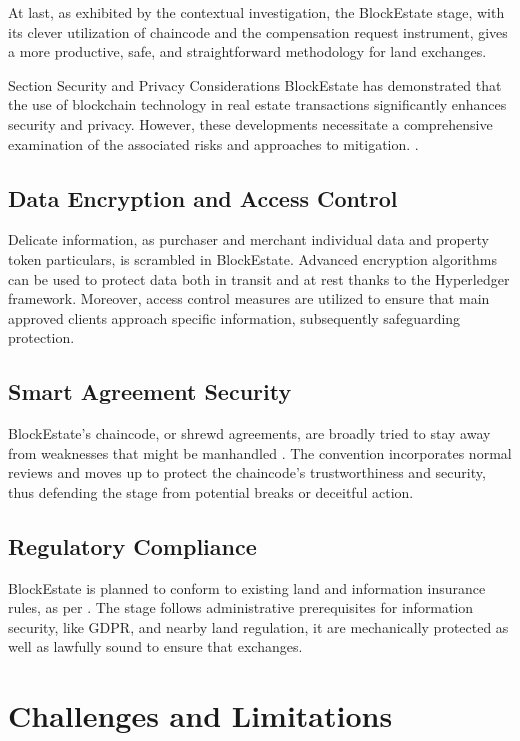 \documentclass[3p,times]{elsarticle}
\begin{document}
At last, as exhibited by the contextual investigation, the BlockEstate stage, with its clever utilization of chaincode and the compensation request instrument, gives a more productive, safe, and straightforward methodology for land exchanges.

Section Security and Privacy Considerations BlockEstate has demonstrated that the use of blockchain technology in real estate transactions significantly enhances security and privacy. However, these developments necessitate a comprehensive examination of the associated risks and approaches to mitigation. \cite{kothari2020smart}.

\subsection{Data Encryption and Access Control}

Delicate information, as purchaser and merchant individual data and property token particulars, is scrambled in BlockEstate. Advanced encryption algorithms can be used to protect data both in transit and at rest thanks to the Hyperledger framework. Moreover, access control measures are utilized to ensure that main approved clients approach specific information, subsequently safeguarding protection.

\subsection{Smart Agreement Security}

BlockEstate's chaincode, or shrewd agreements, are broadly tried to stay away from weaknesses that might be manhandled \cite{baum2021tokenization}. The convention incorporates normal reviews and moves up to protect the chaincode's trustworthiness and security, thus defending the stage from potential breaks or deceitful action.

\subsection{Regulatory Compliance}

BlockEstate is planned to conform to existing land and information insurance rules, as per \cite{moringiello2022blockchain}. The stage follows administrative prerequisites for information security, like GDPR, and nearby land regulation, it are mechanically protected as well as lawfully sound to ensure that exchanges.

\section{Challenges and Limitations}
\end{document}

